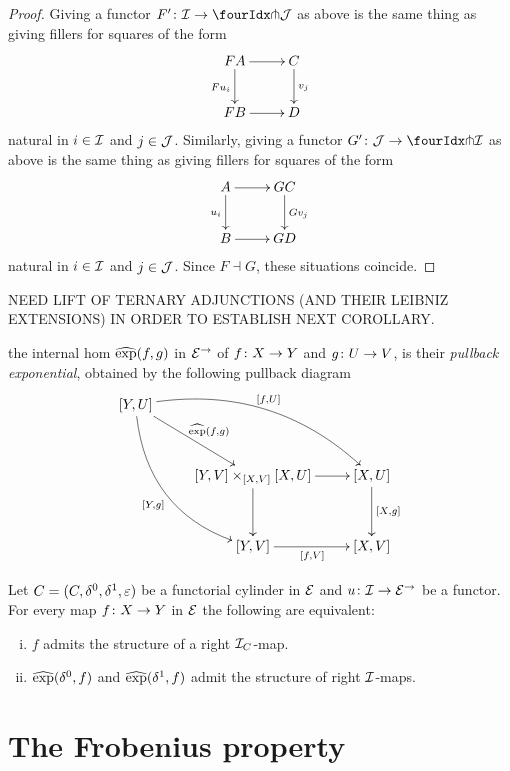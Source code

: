 \documentclass[reqno,10pt,a4paper,oneside]{amsart}
\begin{document}
\begin{proof} Giving a functor $F' \co \cal{I} \to \liftl{\cal{J}}$ as above is the same thing as giving fillers for squares of the form
\[
\xymatrix{
FA \ar[d]_{F u_i} \ar[r] & C \ar[d]^{v_j} \\
FB \ar[r] & D }
\]
natural in $i  \in \cal{I}$ and $j \in \cal{J}$. Similarly, giving a functor $G' \co \cal{J} \to \liftl{\cal{I}}$ as above is the same thing as giving fillers for squares 
of the form
\[
\xymatrix{
A \ar[d]_{u_i} \ar[r] & GC \ar[d]^{Gv_j} \\
B \ar[r] & GD }
\]
 natural in $i \in \cal{I}$ and $j \in \cal{J}$. Since $F \dashv G$, these situations coincide.
\end{proof}



NEED LIFT OF TERNARY ADJUNCTIONS (AND THEIR LEIBNIZ EXTENSIONS) IN ORDER TO ESTABLISH NEXT COROLLARY.

the internal hom $\hatexp(f,g)$ in $\catE^\to$ of $f \co X \to Y$ and $g \co U \to V$, is their \emph{pullback exponential}, obtained by the following pullback diagram
\[
\xymatrix@R=1.2cm{
[Y, U] \ar@/^2pc/[drr]^{[f,U]} \ar@/_2pc/[ddr]_{[Y,g]}  \ar[dr]^{\hatexp(f,g)} & & \\ 
 & [Y,V] \times_{[X,V]} [X,U]  \ar[d] \ar[r] & [X,U] \ar[d]^{[X,g]} \\
 & [Y,V] \ar[r]_{[f,V]} & [X,V] }
 \]



\begin{corollary}[TO BE REWRITTEN] \label{prod-exp-general}
Let $\cyl = (\cyl, \lcyl, \rcyl, \ccyl)$ be a functorial cylinder in $\catE$ and
 $u \co \cal{I} \to \catE^\to$ be a functor. For every map $f \co X \to Y$ in $\cal{E}$ 
 the following are equivalent: 
\begin{enumerate}[(i)]
\item $f$ admits the structure of a right $\cal{I}_\cyl$-map. 
\item $\hatexp(\lcyl, f)$ and $\hatexp(\rcyl, f)$ admit the structure of right $\cal{I}$-maps.
\end{enumerate} 
\end{corollary}






\section{The Frobenius property}
\label{sec:frobenius}
\end{document}

